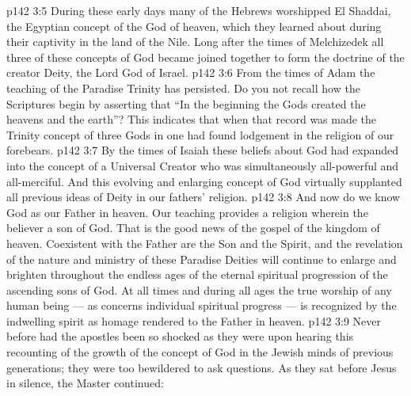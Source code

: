 \vs p142 3:5 \bibnobreakspace {} During these early days many of the Hebrews worshipped El Shaddai, the Egyptian concept of the God of heaven, which they learned about during their captivity in the land of the Nile. Long after the times of Melchizedek all three of these concepts of God became joined together to form the doctrine of the creator Deity, the Lord God of Israel.
\vs p142 3:6 \bibnobreakspace {} From the times of Adam the teaching of the Paradise Trinity has persisted. Do you not recall how the Scriptures begin by asserting that “In the beginning the Gods created the heavens and the earth”? This indicates that when that record was made the Trinity concept of three Gods in one had found lodgement in the religion of our forebears.
\vs p142 3:7 \bibnobreakspace {} By the times of Isaiah these beliefs about God had expanded into the concept of a Universal Creator who was simultaneously all\hyp{}powerful and all\hyp{}merciful. And this evolving and enlarging concept of God virtually supplanted all previous ideas of Deity in our fathers’ religion.
\vs p142 3:8 \bibnobreakspace {} And now do we know God as our Father in heaven. Our teaching provides a religion wherein the believer  a son of God. That is the good news of the gospel of the kingdom of heaven. Coexistent with the Father are the Son and the Spirit, and the revelation of the nature and ministry of these Paradise Deities will continue to enlarge and brighten throughout the endless ages of the eternal spiritual progression of the ascending sons of God. At all times and during all ages the true worship of any human being --- as concerns individual spiritual progress --- is recognized by the indwelling spirit as homage rendered to the Father in heaven.
\vs p142 3:9 \pc Never before had the apostles been so shocked as they were upon hearing this recounting of the growth of the concept of God in the Jewish minds of previous generations; they were too bewildered to ask questions. As they sat before Jesus in silence, the Master continued: 
